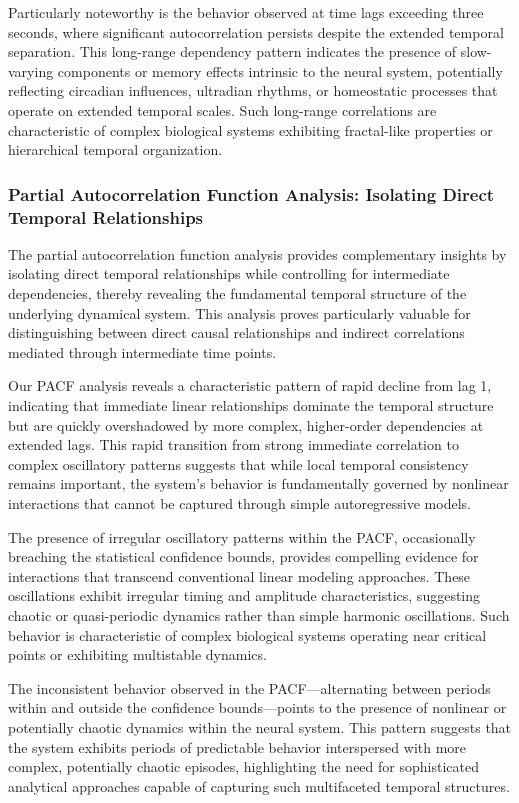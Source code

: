 \documentclass[a4paper,12pt,twoside]{article}
\begin{document}
Particularly noteworthy is the behavior observed at time lags exceeding three seconds, where significant autocorrelation persists despite the extended temporal separation. This long-range dependency pattern indicates the presence of slow-varying components or memory effects intrinsic to the neural system, potentially reflecting circadian influences, ultradian rhythms, or homeostatic processes that operate on extended temporal scales. Such long-range correlations are characteristic of complex biological systems exhibiting fractal-like properties or hierarchical temporal organization.

\subsubsection{Partial Autocorrelation Function Analysis: Isolating Direct Temporal Relationships}

The partial autocorrelation function analysis provides complementary insights by isolating direct temporal relationships while controlling for intermediate dependencies, thereby revealing the fundamental temporal structure of the underlying dynamical system. This analysis proves particularly valuable for distinguishing between direct causal relationships and indirect correlations mediated through intermediate time points.

Our PACF analysis reveals a characteristic pattern of rapid decline from lag 1, indicating that immediate linear relationships dominate the temporal structure but are quickly overshadowed by more complex, higher-order dependencies at extended lags. This rapid transition from strong immediate correlation to complex oscillatory patterns suggests that while local temporal consistency remains important, the system's behavior is fundamentally governed by nonlinear interactions that cannot be captured through simple autoregressive models.

The presence of irregular oscillatory patterns within the PACF, occasionally breaching the statistical confidence bounds, provides compelling evidence for interactions that transcend conventional linear modeling approaches. These oscillations exhibit irregular timing and amplitude characteristics, suggesting chaotic or quasi-periodic dynamics rather than simple harmonic oscillations. Such behavior is characteristic of complex biological systems operating near critical points or exhibiting multistable dynamics.

The inconsistent behavior observed in the PACF—alternating between periods within and outside the confidence bounds—points to the presence of nonlinear or potentially chaotic dynamics within the neural system. This pattern suggests that the system exhibits periods of predictable behavior interspersed with more complex, potentially chaotic episodes, highlighting the need for sophisticated analytical approaches capable of capturing such multifaceted temporal structures.
\end{document}
